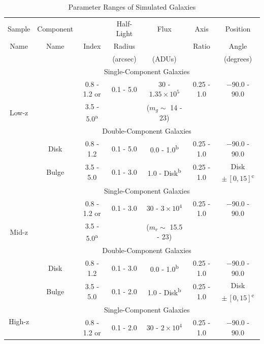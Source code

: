 \begin{table}[htbp]
    \centering
    \caption{Parameter Ranges of Simulated Galaxies \label{tab_c3:sim_para}}
    \begin{tabular}{c|cccccc}
    \hline
    \hline
    Sample & Component & \sersic{} & Half-Light & Flux & Axis & Position\\
    Name & Name & Index & Radius & & Ratio & Angle \\
    & & & (arcsec) & (ADUs) & & (degrees) \\
    \hline
        \hline
        \multirow{5}{*}{Low-z} & \multicolumn{6}{c}{Single-Component Galaxies} \\
        & & 0.8 - 1.2 or  & 0.1 - 5.0 & 30 - $1.35\times10^5$ & 0.25 - 1.0 & $-90.0$ - $90.0$ \\
        & & 3.5 - 5.0\textsuperscript{a} & & ($m_g \sim $ 14 - 23) & & \\
        \cline{2-7}
        & \multicolumn{6}{c}{Double-Component Galaxies} \\
        & Disk & 0.8 - 1.2 & 0.1 - 5.0 & 0.0 - 1.0\textsuperscript{b} & 0.25 - 1.0 & $-90.0$ - 90.0\\
        & Bulge & 3.5 - 5.0 & 0.1 - 3.0 & 1.0 - Disk\textsuperscript{b} & 0.25 - 1.0 &  Disk $\pm\,[0,15]$\textsuperscript{c} \\
        \hline
        \hline
        \multirow{5}{*}{Mid-z} & \multicolumn{6}{c}{Single-Component Galaxies} \\
        & & 0.8 - 1.2 or & 0.1 - 3.0 & 30 - $3\times10^4$ & 0.25 - 1.0 & $-90.0$ - $90.0$ \\
        & & 3.5 - 5.0\textsuperscript{a}& & ($m_r \sim $ 15.5 - 23) & & \\
        \cline{2-7}
        & \multicolumn{6}{c}{Double-Component Galaxies} \\
        & Disk & 0.8 - 1.2 & 0.1 - 3.0 & 0.0 - 1.0\textsuperscript{b} & 0.25 - 1.0 & $-90.0$ - 90.0\\
        & Bulge & 3.5 - 5.0 & 0.1 - 2.0 & 1.0 - Disk\textsuperscript{b} & 0.25 - 1.0 &  Disk $\pm\,[0,15]$\textsuperscript{c} \\
        \hline
        \hline
        \multirow{5}{*}{High-z} & \multicolumn{6}{c}{Single-Component Galaxies} \\
        & & 0.8 - 1.2 or & 0.1 - 2.0 & 30 - $2\times10^4$ & 0.25 - 1.0 & $-90.0$ - $90.0$ \\

\end{tabular}
\end{table}

